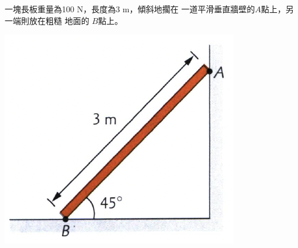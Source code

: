 {
    一塊長板重量為100 N，長度為3 m，傾斜地擱在 一道平滑垂直牆壁的$A$點上，另一端則放在粗糙 地面的 $B$點上。
    \bigskip\par{\par\centering\includegraphics[width=.3\textwidth]{./img/ch3_moment_lq_2024-05-11-19-54-31.png}\par}\bigskip
    }
